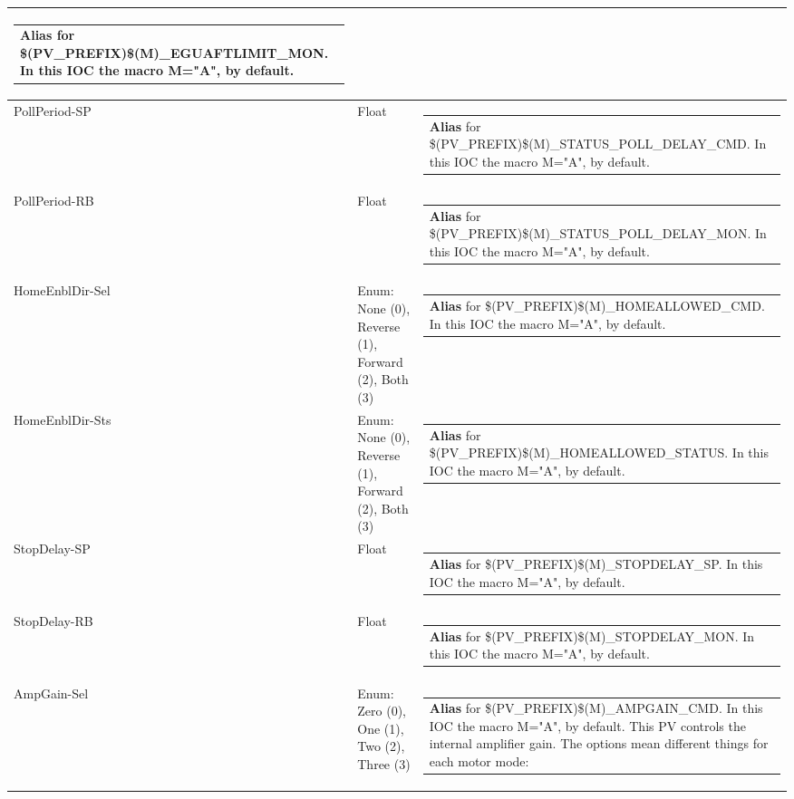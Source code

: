 \documentclass[openany]{article}
\begin{document}
\begin{longtable}{| m{4.5cm} m{2.5cm}  m{8.5cm} |}
\begin{tabular}{@{}m{6cm}@{}}
                \textbf{\color{blue} Alias} for \$(PV\_PREFIX)\$(M)\_EGUAFTLIMIT\_MON. In this IOC the macro M="A", by default.
            \end{tabular} \hypertarget{pv:poll-period}{}\\ \hline
        PollPeriod-SP & Float & \begin{tabular}{@{}m{6cm}@{}}
                \textbf{\color{blue} Alias} for \$(PV\_PREFIX)\$(M)\_STATUS\_POLL\_DELAY\_CMD. In this IOC the macro M="A", by default.
            \end{tabular} \hypertarget{}{}\\ \hline
        PollPeriod-RB & Float & \begin{tabular}{@{}m{6cm}@{}}
                \textbf{\color{blue} Alias} for \$(PV\_PREFIX)\$(M)\_STATUS\_POLL\_DELAY\_MON. In this IOC the macro M="A", by default.
            \end{tabular} \hypertarget{pv:home-enbl-dir}{}\\ \hline
        HomeEnblDir-Sel & Enum: None (0), Reverse (1), Forward (2), Both (3) & \begin{tabular}{@{}m{6cm}@{}}
                \textbf{\color{blue} Alias} for \$(PV\_PREFIX)\$(M)\_HOMEALLOWED\_CMD. In this IOC the macro M="A", by default.
            \end{tabular} \hypertarget{}{}\\ \hline
        HomeEnblDir-Sts & Enum: None (0), Reverse (1), Forward (2), Both (3) & \begin{tabular}{@{}m{6cm}@{}}
                \textbf{\color{blue} Alias} for \$(PV\_PREFIX)\$(M)\_HOMEALLOWED\_STATUS. In this IOC the macro M="A", by default.
            \end{tabular} \hypertarget{pv:stop-delay}{}\\ \hline
        StopDelay-SP & Float & \begin{tabular}{@{}m{6cm}@{}}
                \textbf{\color{blue} Alias} for \$(PV\_PREFIX)\$(M)\_STOPDELAY\_SP. In this IOC the macro M="A", by default.
            \end{tabular} \hypertarget{}{}\\ \hline
        StopDelay-RB & Float & \begin{tabular}{@{}m{6cm}@{}}
                \textbf{\color{blue} Alias} for \$(PV\_PREFIX)\$(M)\_STOPDELAY\_MON. In this IOC the macro M="A", by default.
            \end{tabular} \hypertarget{pv:amp-gain}{}\\ \hline
        AmpGain-Sel & Enum: Zero (0), One (1), Two (2), Three (3) & \begin{tabular}{@{}m{6cm}@{}}
                \textbf{\color{blue} Alias} for \$(PV\_PREFIX)\$(M)\_AMPGAIN\_CMD. In this IOC the macro M="A", by default. This PV controls the internal amplifier gain. The options mean different things for each motor mode:


\end{tabular}
\end{longtable}
\end{document}
